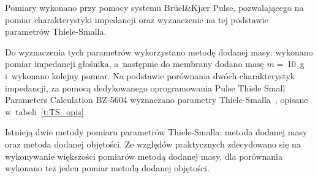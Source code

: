 \documentclass[12pt]{oska}
\begin{document}
			Pomiary wykonano przy pomocy systemu Brüel\&Kjær Pulse, pozwalającego na pomiar charakterystyki impedancji oraz wyznaczenie na tej podstawie parametrów Thiele-Smalla.
			
			Do wyznaczenia tych parametrów wykorzystano metodę dodanej masy: wykonano pomiar impedancji głośnika, a~następnie do membrany dodano masę $m=\,$\SI{10}{\gram} i~wykonano kolejny pomiar. Na podstawie porównania dwóch charakterystyk impedancji, za pomocą dedykowanego oprogramowania Pulse Thiele Small Parameters Calculation BZ-5604 wyznaczano parametry Thiele-Smalla~\cite{BK_pulse_TS}, opisane w~tabeli~\ref{t:TS_opis}.
			
			Istnieją dwie metody pomiaru parametrów Thiele-Smalla: metoda dodanej masy oraz metoda dodanej objętości. Ze względów praktycznych zdecydowano się na wykonywanie większości pomiarów metodą dodanej masy, dla porównania wykonano też jeden pomiar metodą dodanej objętości.
			
\end{document}
